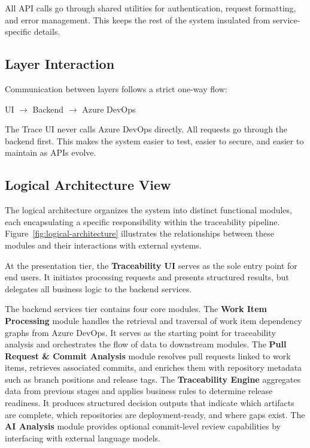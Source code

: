 All API calls go through shared utilities for authentication, request formatting, and error management. This keeps the rest of the system insulated from service-specific details.

\subsection{Layer Interaction}

Communication between layers follows a strict one-way flow:

\begin{center}
UI $\rightarrow$ Backend $\rightarrow$ Azure DevOps
\end{center}

The Trace UI never calls Azure DevOps directly. All requests go through the backend first. This makes the system easier to test, easier to secure, and easier to maintain as APIs evolve.

\subsection{Logical Architecture View}

The logical architecture organizes the system into distinct functional modules, each encapsulating a specific responsibility within the traceability pipeline. Figure~\ref{fig:logical-architecture} illustrates the relationships between these modules and their interactions with external systems.

At the presentation tier, the \textbf{Traceability UI} serves as the sole entry point for end users. It initiates processing requests and presents structured results, but delegates all business logic to the backend services.

The backend services tier contains four core modules. The \textbf{Work Item Processing} module handles the retrieval and traversal of work item dependency graphs from Azure DevOps. It serves as the starting point for traceability analysis and orchestrates the flow of data to downstream modules. The \textbf{Pull Request \& Commit Analysis} module resolves pull requests linked to work items, retrieves associated commits, and enriches them with repository metadata such as branch positions and release tags. The \textbf{Traceability Engine} aggregates data from previous stages and applies business rules to determine release readiness. It produces structured decision outputs that indicate which artifacts are complete, which repositories are deployment-ready, and where gaps exist. The \textbf{AI Analysis} module provides optional commit-level review capabilities by interfacing with external language models.

